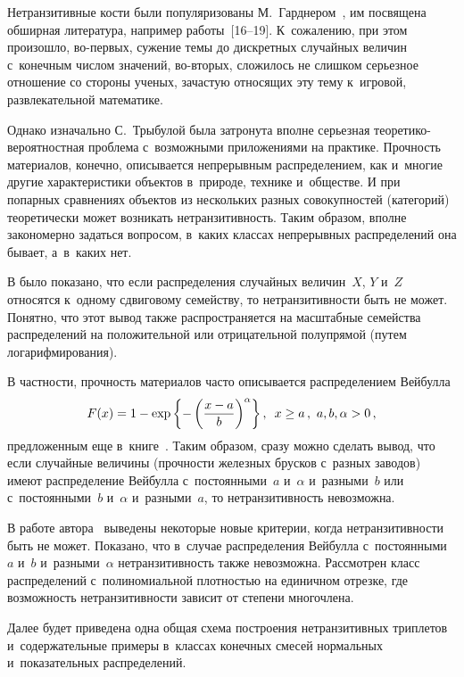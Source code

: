 \begin{multicols}{2}
Нетранзитивные кости были популяризованы М.~Гарднером~\cite{Gard1, Gard15},
им посвящена обширная литература, например работы~[16--19].
К~сожалению, при этом произошло, во-пер\-вых, сужение темы до дискретных
случайных величин с~конечным чис\-лом значений, во-вто\-рых, сложилось 
не слишком серьезное отношение
со стороны ученых, зачастую относящих эту тему к~игровой, развлекательной математике.

Однако изначально С.~Трыбулой была затронута вполне серьезная 
тео\-ре\-ти\-ко-ве\-ро\-ят\-ност\-ная проб\-ле\-ма с~возможными приложениями 
на практике. Прочность материалов, конечно, описывается непрерывным 
распределением, как и~многие другие характеристики объектов в~природе, 
технике и~обществе.
И при попарных сравнениях объектов из нескольких разных совокупностей 
(категорий) теоретически может
возникать нетранзитивность. Таким образом, вполне закономерно задаться 
вопросом, в~каких классах непрерывных распределений она бывает, а~в~каких нет.

В \cite[теорема 2]{Tryb} было показано, что если распределения случайных величин~$X$, 
$Y$ и~$Z$ относятся к~одному сдвиговому семейству, то не\-тран\-зи\-тив\-ности быть не может. 
Понятно,
что этот вывод также распространяется на масштабные семейства распределений 
на положительной
или отрицательной полупрямой (путем логарифмирования).

В частности, прочность материалов часто описывается распределением Вейбулла
\begin{equation*}
F(x)=1-\exp\left\{-\left(\displaystyle\frac{\displaystyle x-a\mathstrut}{\displaystyle b\mathstrut}\right)^\alpha\right\},\enskip
x\ge a\,,\ a,b,\alpha>0\,,
\end{equation*}
предложенным еще в~книге~\cite{Weib}. Таким образом, сразу можно сделать вывод, 
что если случайные величины (прочности железных брусков с~разных заводов) имеют распределение
Вейбулла с~постоянными~$a$ и~$\alpha$ и~разными~$b$ или с~постоянными~$b$ и~$\alpha$ 
и~разными~$a$, то нетранзитивность невозможна.

В работе автора~\cite{Leb-2019} выведены некоторые новые критерии, когда 
нетранзитивности быть не может. Показано, что в~случае распределения Вейбулла 
с~постоянными~$a$ и~$b$ и~разными~$\alpha$ нетранзитивность также невозможна. 
Рассмотрен класс распределений с~полиномиальной плотностью на единичном отрезке, 
где возможность нетранзитивности зависит от степени многочлена.

Далее будет приведена одна общая схема построения нетранзитивных
 триплетов и~содержательные
примеры в~классах конечных смесей нормальных и~показательных распределений.


\end{multicols}
